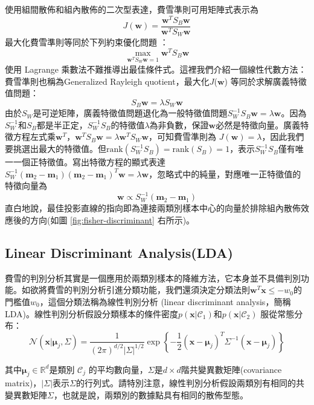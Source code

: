 使用組間散佈和組內散佈的二次型表達，費雪準則可用矩陣式表示為
$$\displaystyle  J(\mathbf{w})=\frac{\mathbf{w}^TS_B\mathbf{w}}{\mathbf{w}^TS_W\mathbf{w}}$$
最大化費雪準則等同於下列約束優化問題 ：
$$\displaystyle  \max_{\mathbf{w}^TS_W\mathbf{w}=1}\mathbf{w}^TS_B\mathbf{w}$$
使用 Lagrange 乘數法不難推導出最佳條件式。這裡我們介紹一個線性代數方法：費雪準則也稱為Generalized Rayleigh quotient，最大化$J$($\mathbf{w}$) 等同於求解廣義特徵值問題：
$$\displaystyle  S_B\mathbf{w}=\lambda S_W\mathbf{w}$$
由於$S_W$是可逆矩陣，廣義特徵值問題退化為一般特徵值問題$S_W^{-1}S_B\mathbf{w}=\lambda\mathbf{w}$。因為$S_W^{-1}$和$S_B$都是半正定，$S_W^{-1}S_B$的特徵值$\lambda$為非負數，保證$\mathbf{w}$必然是特徵向量。廣義特徵方程左式乘$\mathbf{w}^T$，$\mathbf{w}^TS_B\mathbf{w}=\lambda\mathbf{w}^TS_W\mathbf{w}$，可知費雪準則為 $J(\mathbf{w})=\lambda$，因此我們要挑選出最大的特徵值。但$\text{rank}(S_W^{-1}S_B)=\text{rank}(S_B)=1$，表示$S_W^{-1}S_B$僅有唯一一個正特徵值。寫出特徵方程的顯式表達$\displaystyle  S_W^{-1}(\mathbf{m}_2-\mathbf{m}_1)(\mathbf{m}_2-\mathbf{m}_1)^T\mathbf{w}=\lambda\mathbf{w}$，忽略式中的純量，對應唯一正特徵值的特徵向量為
$$\displaystyle  \mathbf{w}\propto S_W^{-1}(\mathbf{m}_2-\mathbf{m}_1)$$
直白地說，最佳投影直線的指向即為連接兩類別樣本中心的向量於排除組內散佈效應後的方向(如圖 \ref{fig:fisher-discriminant} 右所示)。

 
\subsection{Linear Discriminant Analysis(LDA)}
費雪的判別分析其實是一個應用於兩類別樣本的降維方法，它本身並不具備判別功能。如欲將費雪的判別分析引進分類功能，我們還須決定分類法則$\mathbf{w}^T\mathbf{x}\le -w_0$的門檻值$w_0$，這個分類法稱為線性判別分析 (linear discriminant analysis，簡稱LDA)。線性判別分析假設分類樣本的條件密度$p(\mathbf{x}\vert \mathcal{C}_1)$和$p(\mathbf{x}\vert\mathcal{C}_2)$ 服從常態分布：
$$\displaystyle  \mathcal{N}(\mathbf{x}\vert\boldsymbol{\mu}_j,\Sigma)=\frac{1}{(2\pi)^{d/2}\vert\Sigma\vert^{1/2}}\exp\left\{-\frac{1}{2}(\mathbf{x}-\boldsymbol{\mu}_j)^T\Sigma^{-1}(\mathbf{x}-\boldsymbol{\mu}_j)\right\}$$

其中$\boldsymbol{\mu}_j\in\mathbb{R}^d$是類別 $\mathcal{C}_j$ 的平均數向量，$\Sigma$是$d\times d$階共變異數矩陣(covariance matrix)，$\vert\Sigma\vert$表示$\Sigma$的行列式。請特別注意，線性判別分析假設兩類別有相同的共變異數矩陣$\Sigma$，也就是說，兩類別的數據點具有相同的散佈型態。

